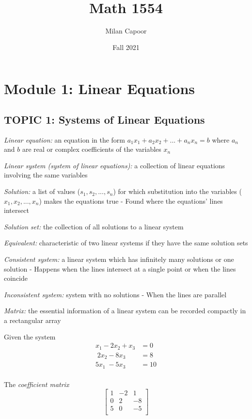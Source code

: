 \documentclass[12pt]{article} %
\title{Math 1554}
\author{Milan Capoor}
\date{Fall 2021} %
\begin{document}
\maketitle

\section{Module 1: Linear Equations}
\subsection{TOPIC 1: Systems of Linear Equations}
\emph{Linear equation:} an equation in the form $a_1 x_1 + a_2 x_2 + ... + a_n x_n = b$ where $a_n$ and $b$ are real or complex coefficients of the variables $x_n$

\emph{Linear system (system of linear equations):} a collection of linear equations involving the same variables

\emph{Solution:} a list of values ($s_1, s_2, ..., s_n$) for which substitution into the variables 
($x_1, x_2, ... , x_n$) makes the equations true
\indent - Found where the equations’ lines intersect 

\emph{Solution set:} the collection of all solutions to a linear system

\emph{Equivalent:} characteristic of two linear systems if they have the same solution sets

\emph{Consistent system:} a linear system which has infinitely many solutions or one solution
\indent - Happens when the lines intersect at a single point or when the lines coincide

\emph{Inconsistent system:} system with no solutions
\indent - When the lines are parallel



\emph{Matrix:} the essential information of a linear system can be recorded compactly in a rectangular array

Given the system
\begin{align*}
x_1 - 2x_2 + x_3 &= 0\\
\;	2x_2 - 8x_3 &= 8\\
5x_1\; 	- 5x_3 &= 10\\
\end{align*}

The \emph{coefficient matrix}
$$\begin{bmatrix}
		1 & -2 & 1\\ 
		0 & 2 & -8 \\
		5 & 0 & -5\\
	\end{bmatrix}$$
\end{document}
